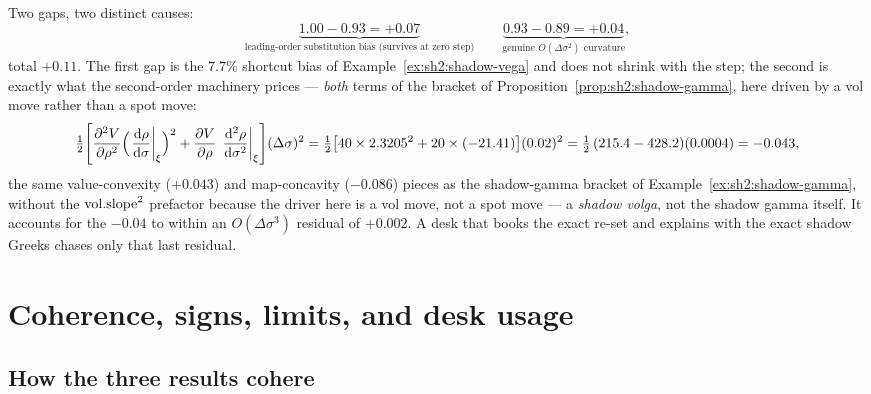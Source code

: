 \begin{example}
\begin{enumerate}[label=(\alph*)]
\end{enumerate}
Two gaps, two distinct causes:
\[
  \underbrace{1.00 - 0.93 = +0.07}_{\text{leading-order substitution bias
  (survives at zero step)}}
  \qquad
  \underbrace{0.93 - 0.89 = +0.04}_{\text{genuine } O(\Delta\sigma^2)
  \text{ curvature}},
\]
total $+0.11$. The first gap is the $7.7\%$ shortcut bias of
Example~\ref{ex:sh2:shadow-vega} and does not shrink with the step; the
second is exactly what the second-order machinery prices --- \emph{both}
terms of the bracket of Proposition~\ref{prop:sh2:shadow-gamma}, here
driven by a vol move rather than a spot move:
\[
  \tfrac12 \Biggl[\frac{\partial^2 V}{\partial \rho^2}\Bigl(\left.\frac{\mathrm{d} \rho}{\mathrm{d} \sigma}\right|_{\xi}\Bigr)^2
  + \frac{\partial V}{\partial \rho}\,\left.\frac{\mathrm{d}^2\rho}{\mathrm{d}\sigma^2}\right|_{\xi}\Biggr]
  (\Delta\sigma)^2
  = \tfrac12 \bigl[40 \times 2.3205^2 + 20 \times (-21.41)\bigr](0.02)^2
  = \tfrac12\,(215.4 - 428.2)(0.0004) = -0.043,
\]
the same value-convexity ($+0.043$) and map-concavity ($-0.086$) pieces as
the shadow-gamma bracket of Example~\ref{ex:sh2:shadow-gamma}, without the
$\mathrm{vol.slope}^2$ prefactor because the driver here is a vol move, not a spot
move --- a \emph{shadow volga}, not the shadow gamma itself. It accounts
for the $-0.04$ to within an $O(\Delta\sigma^3)$ residual of
$+0.002$. A desk that books the exact re-set and explains with the exact
shadow Greeks chases only that last residual.
\end{example}

\section{Coherence, signs, limits, and desk usage}\label{sec:sh2:coherence}

\subsection{How the three results cohere}

